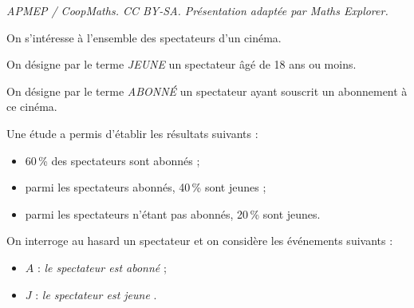 \documentclass[10pt]{article}
\begin{document}
\noindent\textit{APMEP / CoopMaths. CC BY-SA. Présentation adaptée par Maths Explorer.}\par\medskip
On s'intéresse à l'ensemble des spectateurs d'un cinéma.

On désigne par le terme \emph{JEUNE} un spectateur âgé de 18 ans ou moins.

On désigne par le terme \emph{ABONNÉ} un spectateur ayant souscrit un abonnement à ce cinéma.

Une étude a permis d'établir les résultats suivants :

\begin{itemize}[label*=\textbullet~]
	\item 60\,\% des spectateurs sont abonnés ;
	\item parmi les spectateurs abonnés, 40\,\% sont jeunes ;
	\item parmi les spectateurs n'étant pas abonnés, 20\,\% sont jeunes.
\end{itemize}

On interroge au hasard un spectateur et on considère les événements suivants :
\begin{itemize}[label*=\textbullet~]
	\item $A$ : \og \emph{le spectateur est abonné} \fg{} ;
	\item $J$ : \og \emph{le spectateur est jeune} \fg.
\end{itemize}
\end{document}
